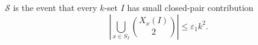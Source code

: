 \begin{definition}
\(\mathcal S\) is the event that every \(k\)-set \(I\) has small closed-pair
contribution
\[
\left|\bigcup_{x\in S_I}\binom{X_x(I)}2\right|\le \varepsilon_1k^2.
\]
\end{definition}
